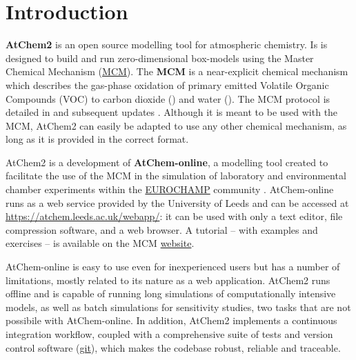 %
%
%
%

\chapter{Introduction} \label{ch:introduction}

\textbf{AtChem2} is an open source modelling tool for atmospheric chemistry.
Is is designed to build and run zero-dimensional box-models using the
Master Chemical Mechanism (\href{http://mcm.leeds.ac.uk/MCM/}{MCM}).
The \textbf{MCM} is a near-explicit chemical mechanism which describes
the gas-phase oxidation of primary emitted Volatile Organic Compounds
(VOC) to carbon dioxide () and water (). The MCM
protocol is detailed in \citet{jenkin_1997} and subsequent updates
\citep{saunders_2003, jenkin_2003, bloss_2005, jenkin_2015}. Although
it is meant to be used with the MCM, AtChem2 can easily be adapted to
use any other chemical mechanism, as long as it is provided in the
correct format.

AtChem2 is a development of \textbf{AtChem-online}, a modelling tool
created to facilitate the use of the MCM in the simulation of
laboratory and environmental chamber experiments within the
\href{https://www.eurochamp.org/}{EUROCHAMP} community
\citep{martin_2009}. AtChem-online runs as a web service provided by
the University of Leeds and can be accessed at
\href{https://atchem.leeds.ac.uk/webapp/}{https://atchem.leeds.ac.uk/webapp/}:
it can be used with only a text editor, file compression software, and a web
browser. A tutorial -- with examples and exercises -- is available on the MCM
\href{http://mcm.leeds.ac.uk/MCMv3.3.1/atchem/tutorial_intro.htt}{website}.

AtChem-online is easy to use even for inexperienced users but has a
number of limitations, mostly related to its nature as a web
application. AtChem2 runs offline and is capable of running long
simulations of computationally intensive models, as well as batch
simulations for sensitivity studies, two tasks that are not possibile
with AtChem-online. In addition, AtChem2 implements a continuous
integration workflow, coupled with a comprehensive suite of tests and
version control software (\href{https://git-scm.com/}{git}), which
makes the codebase robust, reliable and traceable.

